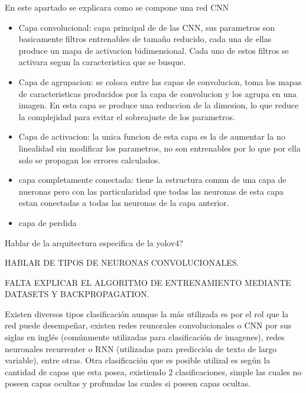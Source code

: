 En este apartado se explicara como se compone una red CNN
\begin{itemize}
    \item Capa convolucional: capa principal de de las CNN, sus parametros son basicamente filtros entrenables de tamaño reducido, cada una de ellas produce un mapa de activacion bidimensional. Cada uno de estos filtros se activara segun la caracteristica que se busque.
    \item Capa de agrupacion: se coloca entre las capas de convolucion, toma los mapas de caracteristicas producidos por la capa de convolucion y los agrupa en una imagen. En esta capa se produce una reduccion de la dimesion, lo que reduce la complejidad para evitar el sobreajuste de los parametros.
    \item Capa de activacion: la unica funcion de esta capa es la de aumentar la no linealidad sin modificar los parametros, no son entrenables por lo que por ella solo se propagan los errores calculados.
    \item capa completamente conectada: tiene la estructura comun de una capa de nueronas pero con las particularidad que todas las neuronas de esta capa estan conectadas a todas las neuronas de la capa anterior.
    \item capa de perdida
\end{itemize}

Hablar de la arquitectura especifica de la yolov4?

HABLAR DE TIPOS DE NEURONAS CONVOLUCIONALES.

FALTA EXPLICAR EL ALGORITMO DE ENTRENAMIENTO MEDIANTE DATASETS Y BACKPROPAGATION.

Existen diversos tipos clasificación aunque la más utilizada es por el rol que la red puede desempeñar, existen redes reunorales convolucionales o CNN por sus siglas en inglés (comúnmente utilizadas para clasificación de imagenes),
redes neuronales recurrenter o RNN (utilizadas para predicción de texto de largo variable), entre otras. Otra clasificación que es posible utilizal es según la cantidad de capas que esta posea, existiendo 2 clasificaciones, simple las cuales no poseen capas ocultas y profundas las cuales si poseen capas ocultas.

